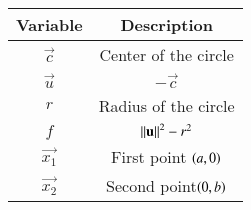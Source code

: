 \begin{tabular}[12pt]{ |c| c|}
    \hline
    \textbf{Variable} & \textbf{Description}\\
    \hline
    $ \vec{c} $ & Center of the circle\\
    \hline
    $ \vec{u} $ & $-\vec{c}$ \\
    \hline
    $ r $ & Radius of the circle\\
    \hline 
    $ f $ & $ \left\lVert\mathbf{u}\right\rVert^{2}-r^{2} $\\
    \hline
    $ \vec{x_{1}}$ & First point $\left(a,0\right)$ \\
    \hline
    $ \vec{x_{2}} $ & Second point$\left(0,b\right)$ \\
    \hline   
    \end{tabular}
